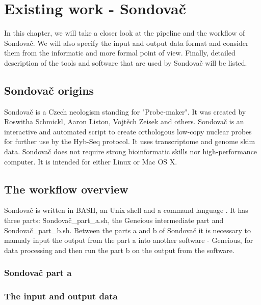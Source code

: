 \chapter[Existing work - Sondovač]{Existing work - Sondovač}
\label{kap:existing_work}

In this chapter, we will take a closer look at the pipeline and the workflow of Sondovač. We 
will also specify the input and output data format and consider them from the informatic and 
more formal point of view. Finally, detailed description of the tools and software that are used by 
Sondovač will be listed. 

\section{Sondovač origins}

Sondovač is a Czech neologism standing for "Probe-maker". It was created by Roswitha Schmickl, 
Aaron Liston, Vojtěch Zeisek and others. 
Sondovač is an interactive and automated script to create orthologous low-copy nuclear 
probes for further use by the Hyb-Seq protocol. It uses transcriptome and genome skim data. 
Sondovač does not require strong bioinformatic skills nor high-performance computer. It is 
intended for either Linux or Mac OS X. 

\section{The workflow overview}

Sondovač is written in BASH, an Unix shell and a command language \cite{bash}. It has three 
parts: Sondovač\_part\_a.sh, the Geneious \cite{geneious} intermediate part and Sondovač\_part\_b.sh. Between 
the parts a and b of Sondovač it is necessary to manualy input the output from the part a into 
another software - Geneious, for data processing and then run the part b on the output from the software. 


\subsection{Sondovač part a}%

\subsection{The input and output data}

